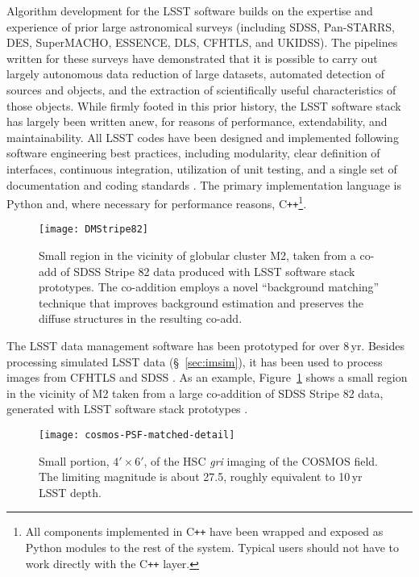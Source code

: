 Algorithm development for the LSST software builds on the expertise
and experience of prior large astronomical surveys (including SDSS,
Pan-STARRS, DES,
SuperMACHO, ESSENCE,  DLS, CFHTLS, and UKIDSS). The pipelines written
for these surveys have demonstrated that it is possible to carry out
largely autonomous data
reduction of large datasets, automated detection of sources and
objects, and the
extraction of scientifically useful characteristics of those objects.
While firmly footed in this prior history, the LSST software stack has
largely been written anew, for reasons of performance, extendability, and
maintainability. All LSST codes have been designed and implemented
following software engineering best practices, including modularity, clear definition
of interfaces, continuous integration,
utilization of unit testing, and a single set of documentation and coding
standards \citep{2018SPIE10707E..09J}. The primary implementation language is Python and, where
necessary for performance reasons, C\texttt{++}\footnote{All components implemented
in C\texttt{++} have been wrapped and exposed as Python modules to the rest of the system.
Typical users should not have to work directly with the C\texttt{++} layer.}.

\begin{figure}
%
%
\texttt{[image: DMStripe82]}
\caption{
Small region in the vicinity of globular cluster M2, taken from a co-add of SDSS Stripe 82 data produced with LSST software stack prototypes. The co-addition employs a novel ``background matching'' technique that improves background estimation and preserves the diffuse structures in the resulting co-add.}
\label{Fig:DMStripe82}
\end{figure}


The LSST data management software has been prototyped for over 8\,yr.
Besides processing simulated LSST data
(\S~\ref{sec:imsim}), it has been used to process images from CFHTLS \citep{2012SPIE.8448E..0MC}
and SDSS \citep{2009ApJS..182..543A}. As an example,
Figure~\ref{Fig:DMStripe82} shows a small region in the vicinity of M2
taken from a large co-addition of SDSS Stripe 82 data, generated with LSST
software stack prototypes \citep{DMTN-035}.

\begin{figure}
\texttt{[image: cosmos-PSF-matched-detail]}
\caption{
  Small portion, $4' \times 6'$, of the HSC \textit{gri} imaging of
  the COSMOS field.  The limiting magnitude is about 27.5, roughly
  equivalent to 10\,yr LSST depth.
  }
\label{Fig:HSC_cosmos}
\end{figure}

